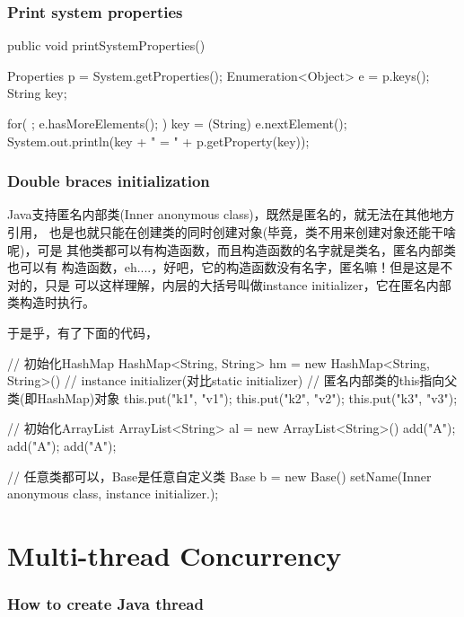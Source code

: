 \documentclass[a4paper,11pt]{article}
\begin{document}
\section[Print system properties]{Print system properties}
\begin{javacode}
public void printSystemProperties() {
  Properties p = System.getProperties();
  Enumeration<Object> e = p.keys();
  String key;
  
  for( ; e.hasMoreElements(); ) {
    key = (String) e.nextElement();
    System.out.println(key + " = " + p.getProperty(key));
  }
}
\end{javacode}

\section[Double braces initialization]{Double braces initialization}
Java支持匿名内部类(Inner anonymous class)，既然是匿名的，就无法在其他地方引用，
也是也就只能在创建类的同时创建对象(毕竟，类不用来创建对象还能干啥呢)，可是
其他类都可以有构造函数，而且构造函数的名字就是类名，匿名内部类也可以有
构造函数，eh....，好吧，它的构造函数没有名字，匿名嘛！但是这是不对的，只是
可以这样理解，内层的大括号叫做instance initializer，它在匿名内部类构造时执行。

于是乎，有了下面的代码，

\begin{javacode}
// 初始化HashMap
HashMap<String, String> hm = new HashMap<String, String>() {
  // instance initializer(对比static initializer)
  {
    // 匿名内部类的this指向父类(即HashMap)对象
    this.put("k1", "v1");
    this.put("k2", "v2");
    this.put("k3", "v3");
  }
}

// 初始化ArrayList
ArrayList<String> al = new ArrayList<String>() {
  {
    add("A");
    add("A");
    add("A");
  }
}

// 任意类都可以，Base是任意自定义类
Base b = new Base() {
  {
    setName(Inner anonymous class, instance initializer.);
  }
}
\end{javacode}


\part[Multi-thread and Concurrency]{Multi-thread Concurrency}
\section[How to create Java thread]{How to create Java thread}
\end{document}
